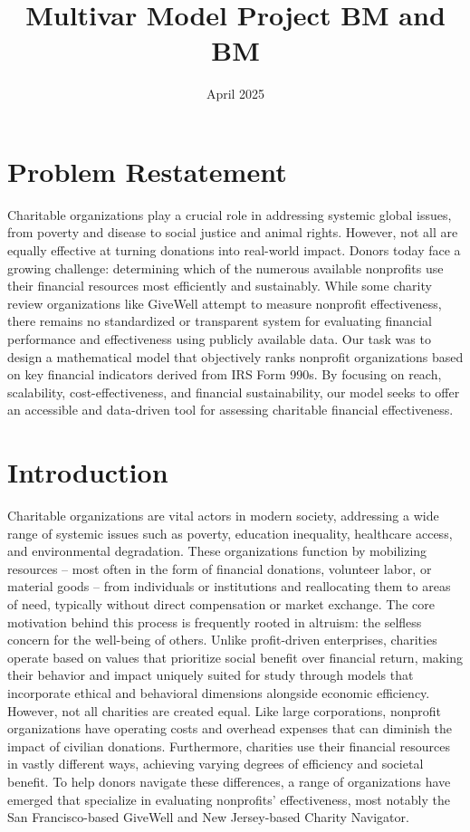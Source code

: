 \documentclass[12pt]{article}
\title{Multivar Model Project BM and BM}
\author{ }
\date{April 2025}
\begin{document}
\maketitle

\section{Problem Restatement}
Charitable organizations play a crucial role in addressing systemic global issues, from poverty and disease to social justice and animal rights. However, not all are equally effective at turning donations into real-world impact. Donors today face a growing challenge: determining which of the numerous available nonprofits use their financial resources most efficiently and sustainably. While some charity review organizations like GiveWell attempt to measure nonprofit effectiveness, there remains no standardized or transparent system for evaluating financial performance and effectiveness using publicly available data. Our task was to design a mathematical model that objectively ranks nonprofit organizations based on key financial indicators derived from IRS Form 990s. By focusing on reach, scalability, cost-effectiveness, and financial sustainability, our model seeks to offer an accessible and data-driven tool for assessing charitable financial effectiveness.

\section{Introduction}

Charitable organizations are vital actors in modern society, addressing a wide range of systemic issues such as poverty, education inequality, healthcare access, and environmental degradation. These organizations function by mobilizing resources – most often in the form of financial donations, volunteer labor, or material goods – from individuals or institutions and reallocating them to areas of need, typically without direct compensation or market exchange. The core motivation behind this process is frequently rooted in altruism: the selfless concern for the well-being of others. Unlike profit-driven enterprises, charities operate based on values that prioritize social benefit over financial return, making their behavior and impact uniquely suited for study through models that incorporate ethical and behavioral dimensions alongside economic efficiency. \\

However, not all charities are created equal. Like large corporations, nonprofit organizations have operating costs and overhead expenses that can diminish the impact of civilian donations. Furthermore, charities use their financial resources in vastly different ways, achieving varying degrees of efficiency and societal benefit. To help donors navigate these differences, a range of organizations have emerged that specialize in evaluating nonprofits' effectiveness, most notably the San Francisco-based GiveWell and New Jersey-based Charity Navigator.\\
\end{document}
